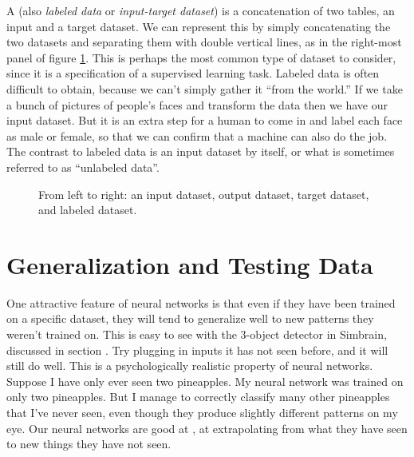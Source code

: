 A  (also \emph{labeled data} or \emph{input-target dataset}) is a concatenation of two tables, an input and a target dataset. We can represent this by simply concatenating the two datasets and separating them with double vertical lines, as in the right-most panel of figure \ref{datasetTypes}. This is perhaps the most common type of dataset to consider, since it is a specification of a supervised learning task. Labeled data is often difficult to obtain, because we can't simply gather it ``from the world.''  If we take a bunch of pictures of people's faces and transform the data then we have our input dataset. But it is an extra step for a human to come in and label each face as male or female, so that we can confirm that a machine can also do the job. The contrast to labeled  data  is an input dataset by itself, or what is sometimes referred to as ``unlabeled data''. 

\begin{figure}[h]
\centering
{}
\caption[Jeff Yoshimi.]{From left to right: an input dataset, output dataset, target dataset, and labeled dataset.}
\label{datasetTypes}
\end{figure}

\section{Generalization and Testing Data }\label{generalization}

One attractive feature of neural networks is that even if they have been trained on a specific dataset, they will tend to generalize well to new patterns they weren't trained on. This is easy to see with the 3-object detector in Simbrain, discussed in section . Try plugging in inputs it has not seen before, and it will still do well. This is a psychologically realistic property of neural networks. Suppose I have only ever seen two pineapples. My neural network was trained on only two pineapples. But I manage to correctly classify many other pineapples that I've never seen, even though they produce slightly different patterns on my eye. Our neural networks are good at , at extrapolating from what they have seen to new things they have not seen.

